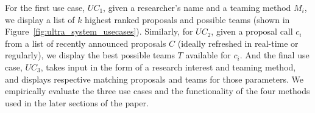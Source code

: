 For the first use case, ${UC}_1$, given a researcher's name and a teaming method $M_i$, we display a list of $k$ highest ranked proposals and possible teams (shown in Figure~\ref{fig:ultra_system_usecases}). Similarly, for ${UC}_2$, given a proposal call $c_i$ from a list of recently announced proposals $C$ (ideally refreshed in real-time or regularly), we display the best possible teams $T$ available for $c_i$. And the final use case, ${UC}_3$, takes input in the form of a research interest and teaming method, and displays respective matching proposals and teams for those parameters. 
We empirically evaluate the three use cases and the functionality of the four methods used in the later sections of the paper. %
